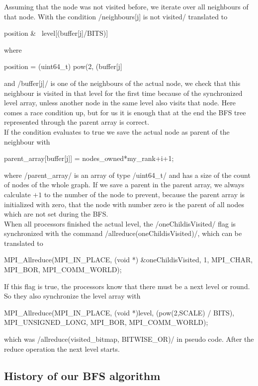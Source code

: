 \documentclass[12pt,a4paper]{article}
\begin{document}
Assuming that the node was not visited before, we iterate over all neighbours of that node. With the condition \cinline/neighbours[j] is not visited/ translated to
\begin{ccode}
position & ~level[(buffer[j]/BITS)]
\end{ccode}
where
\begin{ccode}
position = (uint64_t) pow(2, (buffer[j] %
\end{ccode}
and \cinline/buffer[j]/ is one of the neighbours of the actual node, we check that this neighbour is visited in that level for the first time because of the synchronized level array, unless another node in the same level also visits that node. Here comes a race condition up, but for us it is enough that at the end the BFS tree represented through the parent array is correct.\\
If the condition evaluates to true we save the actual node as parent of the neighbour with
\begin{ccode}
parent_array[buffer[j]] = nodes_owned*my_rank+i+1;
\end{ccode}
where \cinline/parent_array/ is an array of type \cinline/uint64_t/ and has a size of the count of nodes of the whole graph. If we save a parent in the parent array, we always calculate \(+1\) to the number of the node to prevent, because the parent array is initialized with zero, that the node with number zero is the parent of all nodes which are not set during the BFS.\\
When all processors finished the actual level, the \cinline/oneChildisVisited/ flag is synchronized with the command \cinline/allreduce(oneChildisVisited)/, which can be translated to
\begin{ccode}
MPI_Allreduce(MPI_IN_PLACE, (void *) &oneChildisVisited, 1, MPI_CHAR, MPI_BOR, MPI_COMM_WORLD);
\end{ccode}
If this flag is true, the processors know that there must be a next level or round. So they also synchronize the level array with
\begin{ccode}
MPI_Allreduce(MPI_IN_PLACE, (void *)level, (pow(2,SCALE) / BITS), MPI_UNSIGNED_LONG, MPI_BOR, MPI_COMM_WORLD);
\end{ccode}
which was \cinline/allreduce(visited_bitmap, BITWISE_OR)/ in pseudo code. After the reduce operation the next level starts.

\subsection{History of our BFS algorithm}
\label{sec:versions}
\end{document}
